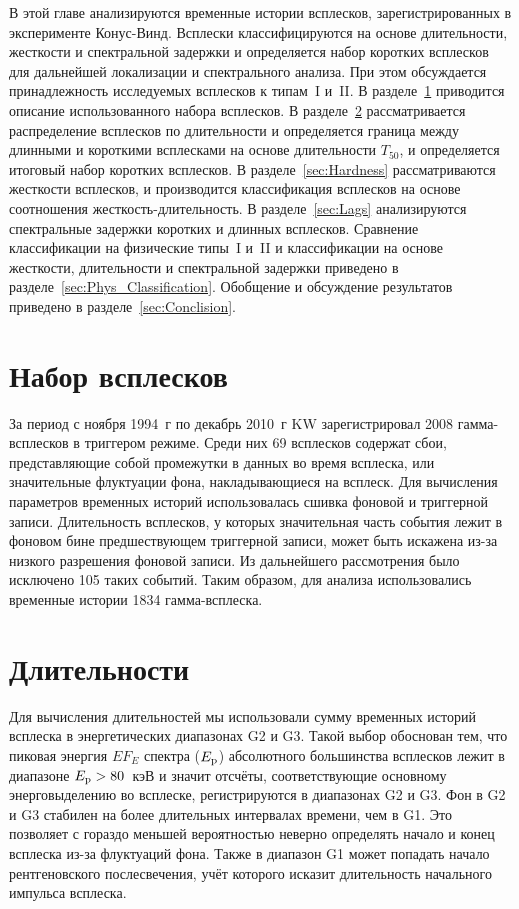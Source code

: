 В этой главе анализируются временные истории всплесков, зарегистрированных в 
эксперименте Конус-Винд. Всплески классифицируются на основе длительности, жесткости и 
спектральной задержки и определяется набор коротких всплесков для дальнейшей локализации и спектрального анализа. 
При этом обсуждается принадлежность исследуемых всплесков к типам~I и~II. 
В разделе~\ref{sec:GRB_sample} приводится описание использованного набора всплесков. 
В разделе~\ref{sec:Durations} рассматривается распределение всплесков по длительности 
и определяется граница между длинными и короткими всплесками на основе 
длительности $T_{50}$, и определяется итоговый набор коротких всплесков. 
В разделе~\ref{sec:Hardness} рассматриваются жесткости всплесков, и производится 
классификация всплесков на основе соотношения жесткость-длительность. 
В разделе~\ref{sec:Lags} анализируются спектральные задержки коротких и длинных всплесков. 
Сравнение классификации на физические типы~I и~II и классификации на основе жесткости, 
длительности и спектральной задержки приведено в разделе~\ref{sec:Phys_Classification}. 
Обобщение и обсуждение результатов приведено в разделе~\ref{sec:Conclision}.  

\section{Набор всплесков}\label{sec:GRB_sample}
За период с ноября 1994~г по декабрь 2010~г KW зарегистрировал 2008 гамма-всплесков 
в триггером режиме. Среди них 69 всплесков содержат сбои, представляющие собой 
промежутки в данных во время всплеска, или значительные флуктуации фона, 
накладывающиеся на всплеск. Для вычисления параметров временных историй использовалась 
сшивка фоновой и триггерной записи. Длительность всплесков, у которых значительная 
часть события лежит в фоновом бине предшествующем триггерной записи, может быть 
искажена из-за низкого разрешения фоновой записи. Из дальнейшего рассмотрения 
было исключено 105 таких событий. Таким образом, для анализа использовались временные 
истории 1834 гамма-всплеска. 

\section{Длительности}\label{sec:Durations}
Для вычисления длительностей мы использовали сумму временных историй всплеска 
в энергетических диапазонах G2 и G3. Такой выбор обоснован тем, что  пиковая 
энергия $E F_{E}$ спектра ($E_{\mathrm{p}}$) абсолютного большинства всплесков лежит в 
диапазоне $E_{\mathrm{p}}>80$~кэВ и значит отсчёты, соответствующие основному энерговыделению 
во всплеске, регистрируются в диапазонах G2 и G3. Фон в G2 и G3 стабилен на более 
длительных интервалах времени, чем в G1. Это позволяет с гораздо меньшей вероятностью 
неверно определять начало и конец всплеска из-за флуктуаций фона. Также в диапазон G1 
может попадать начало рентгеновского послесвечения, учёт которого исказит 
длительность начального импульса всплеска.

